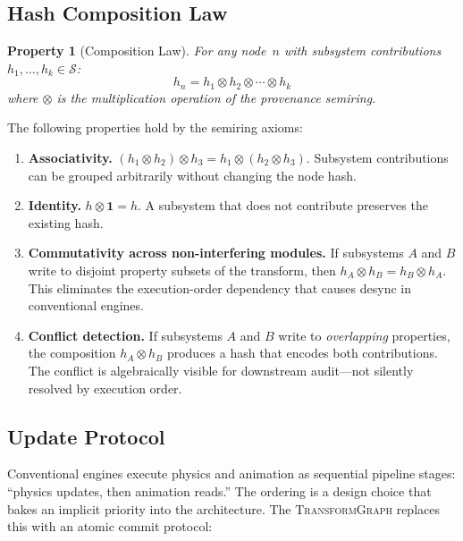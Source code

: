 \documentclass[sigconf,nonacm]{acmart}
\newcommand{\transformgraph}{\textsc{TransformGraph}}
\newcommand{\tropmult}{\otimes}
\newcommand{\provsemiring}{\mathcal{S}} %
\newtheorem{property}{Property}
\begin{document}
\subsection{Hash Composition Law}
\label{sec:composition}

\begin{property}[Composition Law]
For any node~$n$ with subsystem contributions
$h_1, \ldots, h_k \in \provsemiring$:
$$h_n = h_1 \tropmult h_2 \tropmult \cdots \tropmult h_k$$
where $\tropmult$ is the multiplication operation of the
provenance semiring.
\end{property}

The following properties hold by the semiring axioms:

\begin{enumerate}
  \item \textbf{Associativity.} $(h_1 \tropmult h_2) \tropmult h_3
    = h_1 \tropmult (h_2 \tropmult h_3)$. Subsystem contributions
    can be grouped arbitrarily without changing the node hash.
  \item \textbf{Identity.} $h \tropmult \mathbf{1} = h$. A subsystem
    that does not contribute preserves the existing hash.
  \item \textbf{Commutativity across non-interfering modules.}
    If subsystems $A$ and $B$ write to disjoint property subsets
    of the transform, then $h_A \tropmult h_B = h_B \tropmult h_A$.
    This eliminates the execution-order dependency that causes
    desync in conventional engines.
  \item \textbf{Conflict detection.} If subsystems $A$ and $B$
    write to \emph{overlapping} properties, the composition
    $h_A \tropmult h_B$ produces a hash that encodes both
    contributions. The conflict is algebraically visible for
    downstream audit---not silently resolved by execution order.
\end{enumerate}

\subsection{Update Protocol}

Conventional engines execute physics and animation as sequential
pipeline stages: ``physics updates, then animation reads.'' The
ordering is a design choice that bakes an implicit priority into
the architecture. The \transformgraph{} replaces this with an
atomic commit protocol:
\end{document}
